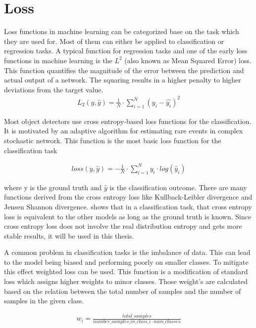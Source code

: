 \documentclass[
a4paper, 
12pt,
grayscalebody, %
abstract=on,
twoside, BCOR10mm, 12pt, DIV13,headinclude, footexclude, final, abstracton, openright
]{ibireprt}
\numberwithin{equation}{chapter}
\numberwithin{table}{chapter}
\numberwithin{figure}{chapter}
\numberwithin{algorithm}{chapter}
\numberwithin{example}{chapter}
\numberwithin{example}{chapter}
\begin{document}
\section{Loss}
Loss functions in machine learning can be categorized base on the task which they are used for. Most of them can either be applied to classification or regression tasks. A typical function for regression tasks and one of the early loss functions in machine learning is the $L^2$ (also known as Mean Squared Error) loss. This function quantifies the magnitude of the error between the prediction and actual output of a network. The squaring results in a higher penalty to higher deviations from the target value. 
\begin{align}
	L_2(y,\hat{y})=\frac{1}{N}\cdot \sum^{N}_{i=1}(y_i-\hat{y_i})^2
\end{align}

Most object detectors use cross entropy-based loss functions for the classification. It is motivated by an adaptive algorithm for estimating rare events in complex stochastic network. This function is the most basic loss function for the classification task 
 
\begin{align}
loss(y,\hat{y}) = - \frac{1}{N} \cdot \sum_{i=1}^{N}y_i \cdot log(\hat{y}_i)
\end{align}

where y is the ground truth and $\hat{y}$ is the classification outcome. There are many functions derived from the cross entropy loss like Kullback-Leibler divergence and Jensen Shannon divergence. \cite{Tian2022} shows that in a classification task, that cross entropy loss is equivalent to the other models as long as the ground truth is known. Since cross entropy loss does not involve the real distribution entropy and gets more stable results, it will be used in this thesis. 

A common problem in classification tasks is the imbalance of data. This can lead to the model being biased and performing poorly on smaller classes. To mitigate this effect weighted loss can be used. This function is a modification of standard loss which assigns higher weights to minor classes. Those weight's are calculated based on the relation between the total number of samples and the number of samples in the given class. 

\begin{align}
	w_i = \frac{total\_samples}{number\_samples\_in\_class\_i \cdot num\_classes}
\end{align}
\end{document}
